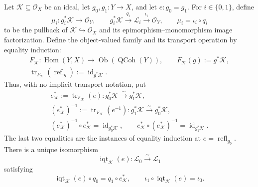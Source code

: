 \begin{lemma}
  \label{lemma:nagata-image-quotient-transport}

  Let $\mathcal K\subseteq\mathcal O_X$ be an ideal, let
  $g_0,g_1\colon Y\to X$, and let $e\colon g_0=g_1$.  For $i\in\{0,1\}$,
  define
  \[
    \mu_i\colon g_i^*\mathcal K\to\mathcal O_Y,
    \qquad
    g_i^*\mathcal K\xrightarrow{q_i}\mathcal L_i
      \xrightarrow{\iota_i}\mathcal O_Y,
    \qquad
    \mu_i=\iota_i\circ q_i                              \tag{IQ0}
  \]
  to be the pullback of $\mathcal K\hookrightarrow\mathcal O_X$ and its
  epimorphism--monomorphism image factorization.  Define the object-valued
  family and its transport operation by equality induction:
  \[
  \begin{gathered}
    F_{\mathcal K}\colon\operatorname{Hom}(Y,X)
      \longrightarrow\operatorname{Ob}(\operatorname{QCoh}(Y)),
    \qquad F_{\mathcal K}(g):=g^*\mathcal K,\\
    \operatorname{tr}_{F_{\mathcal K}}
      (\operatorname{refl}_g)
      :=\operatorname{id}_{g^*\mathcal K}.
  \end{gathered}                                                    \tag{IQ0a}
  \]
  Thus, with no implicit transport notation, put
  \[
  \begin{gathered}
    e_{\mathcal K}^*
      :=\operatorname{tr}_{F_{\mathcal K}}(e)
      \colon g_0^*\mathcal K\xrightarrow{\sim}g_1^*\mathcal K,\\
    (e_{\mathcal K}^*)^{-1}
      :=\operatorname{tr}_{F_{\mathcal K}}(e^{-1})
      \colon g_1^*\mathcal K\xrightarrow{\sim}g_0^*\mathcal K,\\
    (e_{\mathcal K}^*)^{-1}\circ e_{\mathcal K}^*
      =\operatorname{id}_{g_0^*\mathcal K},
    \qquad
    e_{\mathcal K}^*\circ(e_{\mathcal K}^*)^{-1}
      =\operatorname{id}_{g_1^*\mathcal K}.
  \end{gathered}                                                    \tag{IQ0b}
  \]
  The last two equalities are the instances of equality induction at
  $e=\operatorname{refl}_{g_0}$.  There is a unique isomorphism
  \[
    \operatorname{iqt}_{\mathcal K}(e)\colon
      \mathcal L_0\xrightarrow{\sim}\mathcal L_1             \tag{IQ1}
  \]
  satisfying
  \[
    \operatorname{iqt}_{\mathcal K}(e)\circ q_0
      =q_1\circ e_{\mathcal K}^*,
    \qquad
    \iota_1\circ\operatorname{iqt}_{\mathcal K}(e)=\iota_0. \tag{IQ2}
  \]
\end{lemma}

